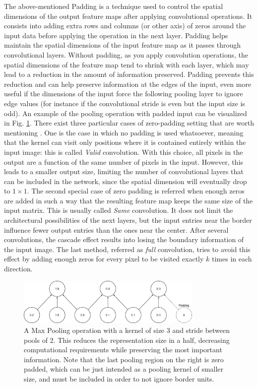 \documentclass[binding=0.7cm, oneside]{sapthesis}
\begin{document}
The above-mentioned Padding is a technique used to control the spatial dimensions of the output feature maps after applying convolutional operations. It consists into adding extra rows and columns (or other axis) of zeros around the input data before applying the operation in the next layer.
Padding helps maintain the spatial dimensions of the input feature map as it passes through convolutional layers. Without padding, as you apply convolution operations, the spatial dimensions of the feature map tend to shrink with each layer, which may lead to a reduction
in the amount of information preserved. Padding prevents this reduction and can help preserve information at the edges of the input, even more useful if the dimensions of the input force the following pooling layer to ignore edge values
(for instance if the convolutional stride is even but the input size is odd). An example of the pooling operation with padded input can be visualized in Fig. \ref{fig:pooling}. There exist three particular cases of zero-padding setting that are worth mentioning \cite{padding_Conv}. One is the case in which no padding is used whatsoever, meaning that the kernel can visit
only positions where it is contained entirely within the input image: this is called \emph{Valid} convolution. With this choice, all pixels in the output are a function of the same number of pixels in the input. However, this leads to a smaller output size, limiting the number of convolutional
layers that can be included in the network, since the spatial dimension will eventually drop to $1 \times 1$. The second special case of zero padding is referred when enough zeros are added in such a way that the resulting feature map keeps the same size of the input matrix. This is usually called \emph{Same} convolution.
It does not limit the architectural possibilities of the next layers, but the input entries near the border influence fewer output entries than the ones near the center. After several convolutions, the cascade effect results into losing the boundary information of the input image.
The last method, referred as \emph{full} convolution, tries to avoid this effect by adding enough zeros for every pixel to be visited exactly $k$ times in each direction.

\begin{figure}[h]
    \centering
    \includegraphics[width=0.8\textwidth]{images/poolingMax.png}
    \caption{A Max Pooling operation with a kernel of size 3 and stride between pools of 2. This reduces the representation size in a half, decreasing computational requirements while preserving the most important information. Note that the last pooling region on the right is zero padded, which can be just intended as a pooling kernel of smaller size, and must be included in order to not ignore border units.}
    \label{fig:pooling}
\end{figure}
\end{document}
